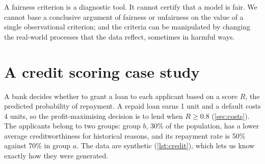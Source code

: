 \begin{pitfall}
A fairness criterion is a diagnostic tool. It cannot certify that a model is fair. We cannot base a conclusive argument
of fairness or unfairness on the value of a single observational criterion; and the criteria can
be manipulated by changing the real-world processes that the data reflect, sometimes in harmful
ways.
\end{pitfall}

\section{A credit scoring case study}\label{sec:creditcase}

A bank decides whether to grant a loan to each applicant based on a score $R$, the predicted
probability of repayment. A repaid loan earns 1 unit and a default costs 4 units, so the
profit-maximising decision is to lend when $R\geq0.8$ (\cref{sec:costs}). The applicants belong to
two groups: group $b$, 30\% of the population, has a lower average creditworthiness for
historical reasons, and its repayment rate is 50\% against 70\% in group $a$. The data are
synthetic (\cref{lst:credit}), which lets us know exactly how they were generated.

